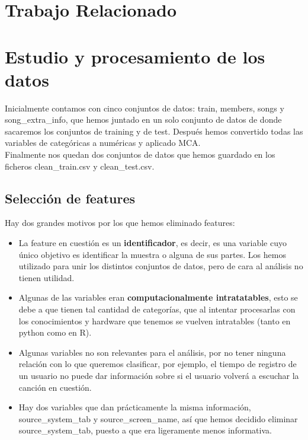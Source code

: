 \documentclass[a4paper]{article}
\begin{document}
\section{Trabajo Relacionado}




\section{Estudio y procesamiento de los datos}
Inicialmente contamos con cinco conjuntos de datos: train, members, songs y song\_extra\_info, que hemos juntado en un solo conjunto de datos de donde sacaremos los conjuntos de training y de test. Después hemos convertido todas las variables de categóricas a numéricas y aplicado MCA.\\
Finalmente nos quedan dos conjuntos de datos que hemos guardado en los ficheros clean\_train.csv y clean\_test.csv.

\subsection{Selección de features}
Hay dos grandes motivos por los que hemos eliminado features: 

\begin{itemize}
\item La feature en cuestión es un \textbf{identificador}, es decir, es una variable cuyo único objetivo es identificar la muestra o alguna de sus partes. Los hemos utilizado para unir los distintos conjuntos de datos, pero de cara al análisis no tienen utilidad.
\item Algunas de las variables eran \textbf{computacionalmente intratatables}, esto se debe a que tienen tal cantidad de categorías, que al intentar procesarlas con los conocimientos y hardware que tenemos se vuelven intratables (tanto en python como en R).
\item Algunas variables no son relevantes para el análisis, por no tener ninguna relación con lo que queremos clasificar, por ejemplo, el tiempo de registro de un usuario no puede dar información sobre si el usuario volverá a escuchar la canción en cuestión. 
\item Hay dos variables que dan prácticamente la misma información, source\_system\_tab y source\_screen\_name, así que hemos decidido eliminar source\_system\_tab, puesto a que era ligeramente menos informativa. 
\end{itemize}
\end{document}
